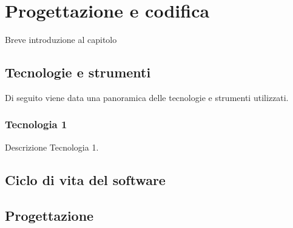 \chapter{Progettazione e codifica}
\label{chap:progettazione-codifica}
Breve introduzione al capitolo

\section{Tecnologie e strumenti}
\label{sec:tecnologie-strumenti}
Di seguito viene data una panoramica delle tecnologie e strumenti utilizzati.

\subsection*{Tecnologia 1}
Descrizione Tecnologia 1.

\section{Ciclo di vita del software}
\label{sec:ciclo-vita-software}

\section{Progettazione}
\label{sec:progettazione}



\newpage